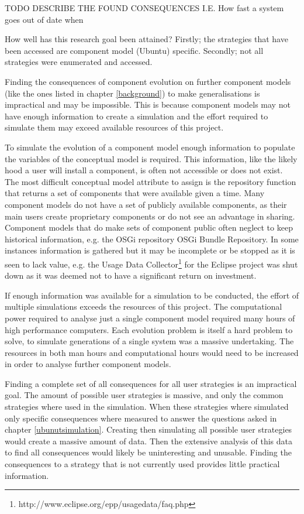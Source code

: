 TODO DESCRIBE THE FOUND CONSEQUENCES I.E. How fast a system goes out of date when

How well has this research goal been attained?
Firstly; the strategies that have been accessed are component model (Ubuntu) specific. 
Secondly; not all strategies were enumerated and accessed.

Finding the consequences of component evolution on further component models (like the ones listed in chapter \ref{background}) to make generalisations is impractical and may be impossible.
This is because component models may not have enough information to create a simulation and the effort required to simulate them may exceed available resources of this project.

To simulate the evolution of a component model enough information to populate the variables of the conceptual model is required.
This information, like the likely hood a user will install a component, is often not accessible or does not exist.
The most difficult conceptual model attribute to assign is the repository function that returns a set of components that were available given a time. 
Many component models do not have a set of publicly available components, as their main users create proprietary components or do not see an advantage in sharing.
Component models that do make sets of component public often neglect to keep historical information, e.g. the OSGi repository OSGi Bundle Repository.
In some instances information is gathered but it may be incomplete or be stopped as it is seen to lack value,  
e.g. the Usage Data Collector\footnote{http://www.eclipse.org/epp/usagedata/faq.php} for the Eclipse project was shut down as it was deemed not to have a significant return on investment.  

If enough information was available for a simulation to be conducted, the effort of multiple simulations exceeds the resources of this project.
The computational power required to analyse just a single component model required many hours of high performance computers.
Each evolution problem is itself a hard problem to solve, to simulate generations of a single system was a massive undertaking.
The resources in both man hours and computational hours would need to be increased in order to analyse further component models.

Finding a complete set of all consequences for all user strategies is an impractical goal.
The amount of possible user strategies is massive, and only the common strategies where used in the simulation.
When these strategies where simulated only specific consequences where measured to answer the questions asked in chapter \ref{ubunutsimulation}.
Creating then simulating all possible user strategies would create a massive amount of data.
Then the extensive analysis of this data to find all consequences would likely be uninteresting and unusable.
Finding the consequences to a strategy that is not currently used provides little practical information.


